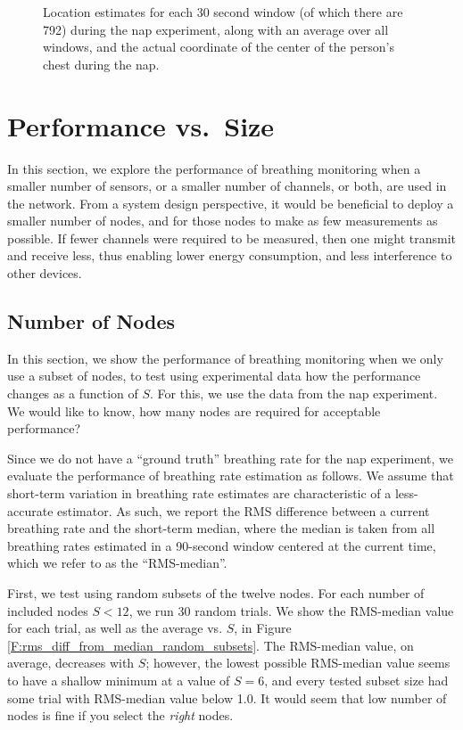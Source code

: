\documentclass[10pt,journal,letterpaper]{IEEEtran}
\begin{document}
\begin{figure}[htbp]
\centerline{ }
\caption{Location estimates for each 30 second window (of which there are 792) during the nap experiment, along with an average over all windows, and the actual coordinate of the center of the person's chest during the nap.  }
    \label{F:breathingLocMapsNap}
\end{figure}



\section{Performance vs.~Size}

In this section, we explore the performance of breathing monitoring when a smaller number of sensors, or a smaller number of channels, or both, are used in the network.  From a system design perspective, it would be beneficial to deploy a smaller number of nodes, and for those nodes to make as few measurements as possible.  If fewer channels were required to be measured, then one might transmit and receive less, thus enabling lower energy consumption, and less interference to other devices.

\subsection{Number of Nodes}

In this section, we show the performance of breathing monitoring when we only use a subset of nodes, to test using experimental data how the performance changes as a function of $S$.  For this, we use the data from the nap experiment. We would like to know, how many nodes are required for acceptable performance?  

Since we do not have a ``ground truth'' breathing rate for the nap experiment, we evaluate the performance of breathing rate estimation as follows.  We assume that short-term variation in breathing rate estimates are characteristic of a less-accurate estimator.  As such, we report the RMS difference between a current breathing rate and the short-term median, where the median is taken from all breathing rates estimated in a 90-second window centered at the current time, which we refer to as the ``RMS-median''.  

First, we test using random subsets of the twelve nodes.  For each number of included nodes $S<12$, we run 30 random trials.  We show the RMS-median value for each trial, as well as the average vs. $S$, in Figure \ref{F:rms_diff_from_median_random_subsets}.  The RMS-median value, on average, decreases with $S$; however, the lowest possible RMS-median value seems to have a shallow minimum at a value of $S=6$, and every tested subset size had some trial with RMS-median value below 1.0.  It would seem that low number of nodes is fine if you select the \emph{right} nodes.
\end{document}
